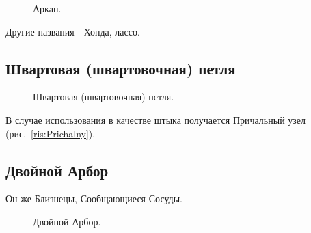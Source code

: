 \begin{figure}[H]\centering
	\begin{minipage}{1\linewidth}
		\begin{center}
			\tcbox[enhanced jigsaw,colframe=black,opacityframe=0.5,opacityback=0.5]
			{\centering{}}
		\end{center}
	\end{minipage}
\caption{Аркан.}
\label{ris:Arkan}
\end{figure}

Другие названия - Хонда, лассо.

\subsection{Швартовая (швартовочная) петля}

\begin{figure}[H]\centering
	\begin{minipage}{1\linewidth}
		\begin{center}
			\tcbox[enhanced jigsaw,colframe=black,opacityframe=0.5,opacityback=0.5]
			{\centering{}}
		\end{center}
	\end{minipage}
\caption{Швартовая (швартовочная) петля.}
\label{ris:Shvartovochnaya}
\end{figure}

В случае использования в качестве штыка получается Причальный узел (рис.~\ref{ris:Prichalny}).

\subsection{Двойной Арбор}

Он же Близнецы, Сообщающиеся Сосуды.

\begin{figure}[H]\centering
\hfil
	\caption{Двойной Арбор.}\label{ris:Double_arbor}
\end{figure}

